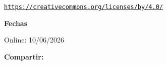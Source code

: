 \begin{textblock*}{68mm}
{\begin{minipage}[t]{68mm}
{\scriptsize\texttt{\href{https://creativecommons.org/licenses/by/4.0/}{https://creativecommons.org/licenses/by/4.0/}}}\par
\vspace{6pt}
{\bfseries\color{azulrevista!70}Fechas}\par\vspace{2pt}
Online: 10/06/2026\par
\vspace{6pt}
\vspace{6pt}
{\bfseries\color{azulrevista!70}Compartir:}\par\vspace{3pt}
{\large
\href{https://bsky.app/intent/compose?text=https%3A%2F%2Fwww.redalyc.org%2Fjournal%2F4136%2F413677448001%2Fhtml%2F}{}~
\href{mailto:?subject=Desigualdad%20digital%20y%20rendimiento%20acad%C3%A9mico%20en%20la%20educaci%C3%B3n%20superior%3A%20un%20estudio%20comparativo%20en%20universidades%20p%C3%BAblicas%20de%20Argentina%20y%20M%C3%A9xico&body=https%3A%2F%2Fwww.redalyc.org%2Fjournal%2F4136%2F413677448001%2Fhtml%2F}{}~
\href{https://www.facebook.com/sharer/sharer.php?u=https%3A%2F%2Fwww.redalyc.org%2Fjournal%2F4136%2F413677448001%2Fhtml%2F}{}~
\href{https://www.linkedin.com/sharing/share-offsite/?url=https%3A%2F%2Fwww.redalyc.org%2Fjournal%2F4136%2F413677448001%2Fhtml%2F}{}~
\href{https://www.reddit.com/submit?url=https%3A%2F%2Fwww.redalyc.org%2Fjournal%2F4136%2F413677448001%2Fhtml%2F&title=Desigualdad%20digital%20y%20rendimiento%20acad%C3%A9mico%20en%20la%20educaci%C3%B3n%20superior%3A%20un%20estudio%20comparativo%20en%20universidades%20p%C3%BAblicas%20de%20Argentina%20y%20M%C3%A9xico}{}~
\href{https://www.researchgate.net/search?q=Desigualdad%20digital%20y%20rendimiento%20acad%C3%A9mico%20en%20la%20educaci%C3%B3n%20superior%3A%20un%20estudio%20comparativo%20en%20universidades%20p%C3%BAblicas%20de%20Argentina%20y%20M%C3%A9xico}{}~
\href{https://t.me/share/url?url=https%3A%2F%2Fwww.redalyc.org%2Fjournal%2F4136%2F413677448001%2Fhtml%2F&text=Desigualdad%20digital%20y%20rendimiento%20acad%C3%A9mico%20en%20la%20educaci%C3%B3n%20superior%3A%20un%20estudio%20comparativo%20en%20universidades%20p%C3%BAblicas%20de%20Argentina%20y%20M%C3%A9xico}{}~
}
\end{minipage}}
\end{textblock*}
